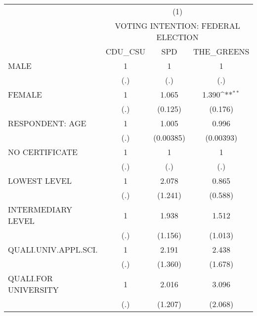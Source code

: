 {
\def\sym#1{\ifmmode^{#1}\else\(^{#1}\)\fi}
\begin{tabular}{l*{3}{c}}
\hline\hline
                              &\multicolumn{3}{c}{(1)}                                    \\
                              &\multicolumn{3}{c}{VOTING INTENTION: FEDERAL ELECTION}     \\
                              &   CDU\_CSU         &       SPD         &THE\_GREENS         \\
\hline
MALE                          &         1         &         1         &         1         \\
                              &       (.)         &       (.)         &       (.)         \\
[1em]
FEMALE                        &         1         &     1.065         &     1.390\sym{**} \\
                              &       (.)         &   (0.125)         &   (0.176)         \\
[1em]
RESPONDENT: AGE               &         1         &     1.005         &     0.996         \\
                              &       (.)         & (0.00385)         & (0.00393)         \\
[1em]
NO CERTIFICATE                &         1         &         1         &         1         \\
                              &       (.)         &       (.)         &       (.)         \\
[1em]
LOWEST LEVEL                  &         1         &     2.078         &     0.865         \\
                              &       (.)         &   (1.241)         &   (0.588)         \\
[1em]
INTERMEDIARY LEVEL            &         1         &     1.938         &     1.512         \\
                              &       (.)         &   (1.156)         &   (1.013)         \\
[1em]
QUALI.UNIV.APPL.SCI.          &         1         &     2.191         &     2.438         \\
                              &       (.)         &   (1.360)         &   (1.678)         \\
[1em]
QUALI.FOR UNIVERSITY          &         1         &     2.016         &     3.096         \\
                              &       (.)         &   (1.207)         &   (2.068)         \\

\end{tabular}}
